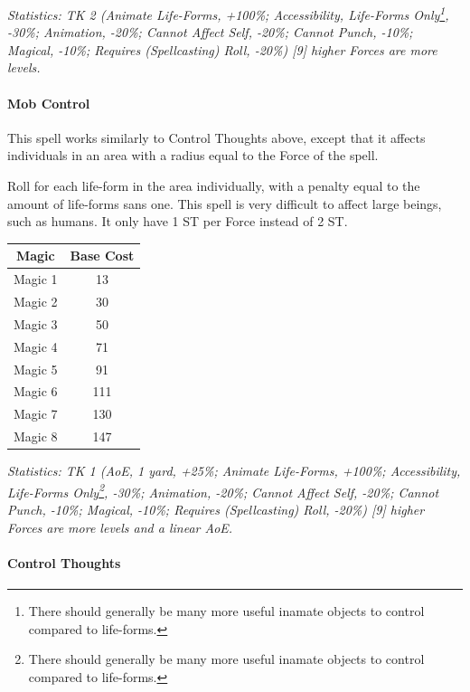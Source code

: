 \begin{multicols*}{3}
	\textcolor{OliveGreen}{\textit{Statistics: TK 2 (Animate Life-Forms, +100\%; Accessibility, Life-Forms Only\footnote{There should generally be many more useful inamate objects to control compared to life-forms.}, -30\%; Animation, -20\%; Cannot Affect Self, -20\%; Cannot Punch, -10\%; Magical, -10\%; Requires (Spellcasting) Roll, -20\%) [9] higher Forces are more levels. }}
	
	\paragraph{Mob Control}
	
	This spell works similarly to Control Thoughts above, except that it affects individuals in an area with a radius equal to the Force of the spell.
	
	Roll for each life-form in the area individually, with a penalty equal to the amount of life-forms sans one.
	This spell is very difficult to affect large beings, such as humans. It only have 1 ST per Force instead of 2 ST.
	
	\begin{center}
		\begin{tabular}{|c|c|}
			\hline
			Magic & Base Cost \\
			\hline
			\hline
			Magic 1 & 13 \\
			Magic 2 & 30 \\
			Magic 3 & 50 \\
			Magic 4 & 71 \\
			Magic 5 & 91 \\
			Magic 6 & 111 \\
			Magic 7 & 130 \\
			Magic 8 & 147 \\
			\hline
		\end{tabular}
	\end{center}
		
	\textcolor{OliveGreen}{\textit{Statistics: TK 1 (AoE, 1 yard, +25\%; Animate Life-Forms, +100\%; Accessibility, Life-Forms Only\footnote{There should generally be many more useful inamate objects to control compared to life-forms.}, -30\%; Animation, -20\%; Cannot Affect Self, -20\%; Cannot Punch, -10\%; Magical, -10\%; Requires (Spellcasting) Roll, -20\%) [9] higher Forces are more levels and a linear AoE. }} 

	\paragraph{Control Thoughts}
	

\end{multicols*}
